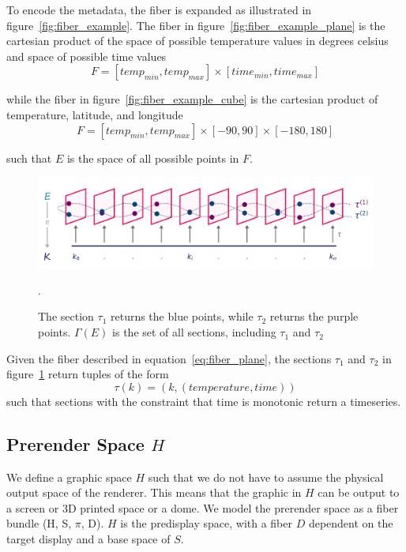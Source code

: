 \documentclass[../main.tex]{subfiles}
\begin{document}
To encode the metadata, the fiber is expanded as illustrated in figure~\ref{fig:fiber_example}. The fiber in figure~\ref{fig:fiber_example_plane} is the cartesian product of the space of possible temperature values in degrees celsius and space of possible time values
\begin{equation}
F = [temp_{min}, temp_{max}] \times [time_{min}, time_{max}]
\label{eq:fiber_plane}
\end{equation}

while the fiber in figure~\ref{fig:fiber_example_cube} is the cartesian product of temperature, latitude, and longitude
\begin{equation}
F = [temp_{min}, temp_{max}] \times [-90, 90] \times [-180, 180]
\label{eg:fiber_cube}
\end{equation}

such that $E$ is the space of all possible points in $F$.

\begin{figure}[H]
    \includegraphics[width=1\linewidth]{figures/math/fiberbundle.png}
    \label{fig:fiber_example_section}
    \caption{The section $\tau_1$ returns the blue points,  while $\tau_2$ returns the purple points. $\Gamma(E)$ is the set of all sections, including $\tau_1$ and $\tau_2$}.  
\end{figure}
Given the fiber described in equation~\ref{eq:fiber_plane}, the sections $\tau_{1}$ and $\tau_{2}$ in figure~\ref{fig:fiber_example_section} return tuples of the form
\begin{equation}
\tau(k) = (k, (temperature, time))
\end{equation}
such that sections with the constraint that time is monotonic return a timeseries. 


\subsection{Prerender Space $H$}
\label{sec:display}
We define a graphic space $H$ such that we do not have to assume the physical output space of the renderer. This means that the graphic in $H$ can be output to a screen or 3D printed space or a dome. We model the prerender space as a fiber bundle (H, S, $\pi$, D). $H$ is the predisplay space, with a fiber $D$ dependent on the target display and a base space of $S$. 
\end{document}

